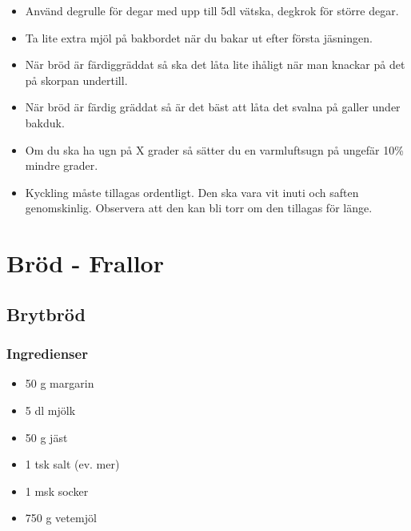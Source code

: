\documentclass[a4paper,11pt,twocolumn]{article}
\begin{document}
\begin{itemize}
\begin{enumerate}
        \item Tillsätt frön, margarin (rumsvarmt), olja, mm och kör 1-2 minuter.
        \item Kör på och ev mer mjöl tills släpper från väggen.
        \item Fortsätt som vanligt, första jäsningen går lite snabbare.
    \end{enumerate}
    \item Använd degrulle för degar med upp till 5dl vätska, degkrok för större degar.
    \item Ta lite extra mjöl på bakbordet när du bakar ut efter första jäsningen.
    \item När bröd är färdiggräddat så ska det låta lite ihåligt när man knackar på det på skorpan undertill.
    \item När bröd är färdig gräddat så är det bäst att låta det svalna på galler under bakduk.
    \item Om du ska ha ugn på X grader så sätter du en varmluftsugn på ungefär 10\% mindre grader.
    \item Kyckling måste tillagas ordentligt. Den ska vara vit inuti och saften genomskinlig. Observera att den kan bli torr om den tillagas för länge.
\end{itemize}

\section{Bröd - Frallor}




\subsection{Brytbröd}
\subsubsection*{Ingredienser}
\begin{itemize}[noitemsep]
    \item 50 g margarin
    \item 5 dl mjölk
    \item 50 g jäst
    \item 1 tsk salt (ev. mer)
    \item 1 msk socker
    \item 750 g vetemjöl
\end{itemize}
\end{document}
